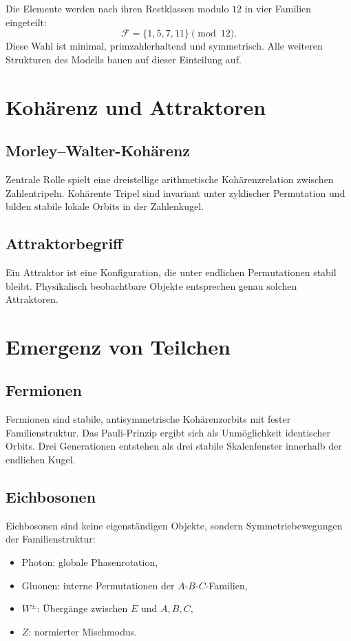 \documentclass[11pt,a4paper]{article}
\begin{document}
Die Elemente werden nach ihren Restklassen modulo $12$
in vier Familien eingeteilt:
\[
\mathcal{F}=\{1,5,7,11\}\pmod{12}.
\]
Diese Wahl ist minimal, primzahlerhaltend
und symmetrisch.
Alle weiteren Strukturen des Modells
bauen auf dieser Einteilung auf.

\section{Kohärenz und Attraktoren}

\subsection{Morley--Walter-Kohärenz}

Zentrale Rolle spielt eine dreistellige
arithmetische Kohärenzrelation
zwischen Zahlentripeln.
Kohärente Tripel sind invariant
unter zyklischer Permutation
und bilden stabile lokale Orbits
in der Zahlenkugel.

\subsection{Attraktorbegriff}

Ein Attraktor ist eine Konfiguration,
die unter endlichen Permutationen
stabil bleibt.
Physikalisch beobachtbare Objekte
entsprechen genau solchen Attraktoren.

\section{Emergenz von Teilchen}

\subsection{Fermionen}

Fermionen sind stabile,
antisymmetrische Kohärenzorbits
mit fester Familienstruktur.
Das Pauli-Prinzip
ergibt sich als Unmöglichkeit
identischer Orbits.
Drei Generationen entstehen
als drei stabile Skalenfenster
innerhalb der endlichen Kugel.

\subsection{Eichbosonen}

Eichbosonen sind keine eigenständigen Objekte,
sondern Symmetriebewegungen
der Familienstruktur:
\begin{itemize}
\item Photon: globale Phasenrotation,
\item Gluonen: interne Permutationen der $A$-$B$-$C$-Familien,
\item $W^\pm$: Übergänge zwischen $E$ und $A,B,C$,
\item $Z$: normierter Mischmodus.
\end{itemize}
\end{document}

